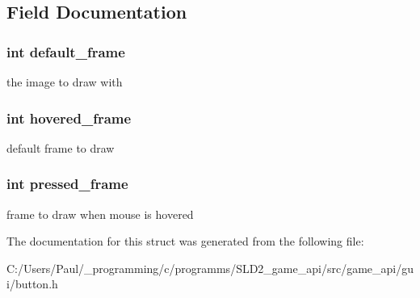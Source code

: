 \subsection{Field Documentation}
\hypertarget{struct___button___image___info_ae230b35bb2d14768abde2227b5cbc699}{
\subsubsection[{default\+\_\+frame}]{\setlength{\rightskip}{0pt plus 5cm}int default\+\_\+frame}}\label{struct___button___image___info_ae230b35bb2d14768abde2227b5cbc699}
the image to draw with \hypertarget{struct___button___image___info_af8a5ba21b924c957da4106fe3fcab385}{
\subsubsection[{hovered\+\_\+frame}]{\setlength{\rightskip}{0pt plus 5cm}int hovered\+\_\+frame}}\label{struct___button___image___info_af8a5ba21b924c957da4106fe3fcab385}
default frame to draw \hypertarget{struct___button___image___info_ae1f9cd93a73ff8eff6bdd7319b79e794}{
\subsubsection[{pressed\+\_\+frame}]{\setlength{\rightskip}{0pt plus 5cm}int pressed\+\_\+frame}}\label{struct___button___image___info_ae1f9cd93a73ff8eff6bdd7319b79e794}
frame to draw when mouse is hovered 

The documentation for this struct was generated from the following file\+:\begin{DoxyCompactItemize}
\item 
C\+:/\+Users/\+Paul/\+\_\+programming/c/programms/\+S\+L\+D2\+\_\+game\+\_\+api/src/game\+\_\+api/gui/button.\+h\end{DoxyCompactItemize}
